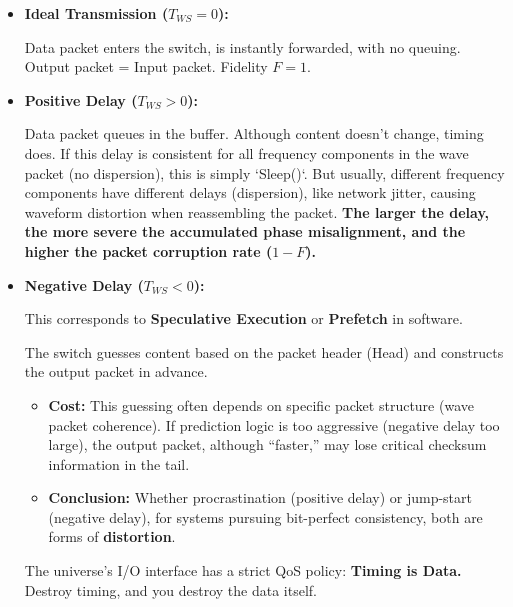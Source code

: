 \begin{itemize}
\item \textbf{Ideal Transmission ($T_{WS} = 0$):}

    Data packet enters the switch, is instantly forwarded, with no queuing. Output packet = Input packet. Fidelity $F=1$.

\item \textbf{Positive Delay ($T_{WS} > 0$):}

    Data packet queues in the buffer. Although content doesn't change, timing does. If this delay is consistent for all frequency components in the wave packet (no dispersion), this is simply `Sleep()`. But usually, different frequency components have different delays (dispersion), like network jitter, causing waveform distortion when reassembling the packet. \textbf{The larger the delay, the more severe the accumulated phase misalignment, and the higher the packet corruption rate ($1-F$).}

\item \textbf{Negative Delay ($T_{WS} < 0$):}

    This corresponds to \textbf{Speculative Execution} or \textbf{Prefetch} in software.

    The switch guesses content based on the packet header (Head) and constructs the output packet in advance.

    \begin{itemize}
    \item \textbf{Cost:} This guessing often depends on specific packet structure (wave packet coherence). If prediction logic is too aggressive (negative delay too large), the output packet, although ``faster,'' may lose critical checksum information in the tail.

    \item \textbf{Conclusion:} Whether procrastination (positive delay) or jump-start (negative delay), for systems pursuing bit-perfect consistency, both are forms of \textbf{distortion}.
    \end{itemize}

    The universe's I/O interface has a strict QoS policy: \textbf{Timing is Data.} Destroy timing, and you destroy the data itself.
\end{itemize}

